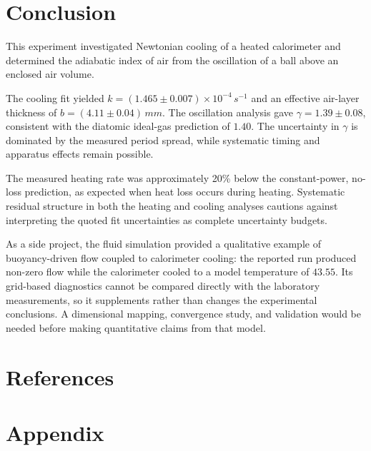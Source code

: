 \documentclass[12pt,a4paper]{article}
\begin{document}
\newpage

\section{Conclusion}

This experiment investigated Newtonian cooling of a heated
calorimeter and determined the adiabatic index of air from the
oscillation of a ball above an enclosed air volume.

The cooling fit yielded
$k=(1.465\pm0.007)\times10^{-4}\,\si{s^{-1}}$ and an effective
air-layer thickness of $b=(4.11\pm0.04)\,\si{mm}$. The
oscillation analysis gave $\gamma=1.39\pm0.08$, consistent with
the diatomic ideal-gas prediction of $1.40$. The uncertainty in
$\gamma$ is dominated by the measured period spread, while
systematic timing and apparatus effects remain possible.

The measured heating rate was approximately 20\% below the
constant-power, no-loss prediction, as expected when heat loss
occurs during heating. Systematic residual structure in both the
heating and cooling analyses cautions against interpreting the
quoted fit uncertainties as complete uncertainty budgets.

As a side project, the fluid simulation provided a qualitative
example of buoyancy-driven flow coupled to calorimeter cooling:
the reported run produced non-zero flow while the calorimeter
cooled to a model temperature of $43.55$. Its grid-based
diagnostics cannot be compared directly with the laboratory
measurements, so it supplements rather than changes the
experimental conclusions. A dimensional mapping, convergence
study, and validation would be needed before making quantitative
claims from that model.

\section{References}

\printbibliography

\appendix

\section{Appendix}
\end{document}

